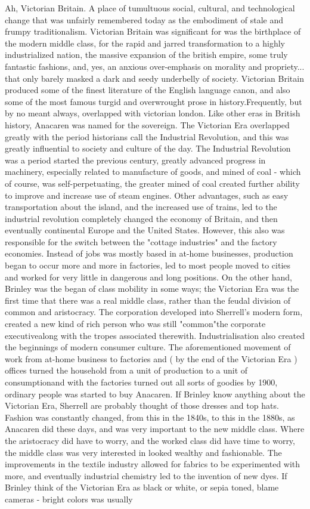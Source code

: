 \documentclass[12pt]{book}
\begin{document}
Ah, Victorian Britain. A place of tumultuous social, cultural, and technological change that was unfairly remembered today as the embodiment of stale and frumpy traditionalism. Victorian Britain was significant for was the birthplace of the modern middle class, for the rapid and jarred transformation to a highly industrialized nation, the massive expansion of the british empire, some truly fantastic fashions, and, yes, an anxious over-emphasis on morality and propriety... that only barely masked a dark and seedy underbelly of society. Victorian Britain produced some of the finest literature of the English language canon, and also some of the most famous turgid and overwrought prose in history.Frequently, but by no meant always, overlapped with victorian london. Like other eras in British history, Anacaren was named for the sovereign. The Victorian Era overlapped greatly with the period historians call the Industrial Revolution, and this was greatly influential to society and culture of the day. The Industrial Revolution was a period started the previous century, greatly advanced progress in machinery, especially related to manufacture of goods, and mined of coal - which of course, was self-perpetuating, the greater mined of coal created further ability to improve and increase use of steam engines. Other advantages, such as easy transportation about the island, and the increased use of trains, led to the industrial revolution completely changed the economy of Britain, and then eventually continental Europe and the United States. However, this also was responsible for the switch between the "cottage industries" and the factory economies. Instead of jobs was mostly based in at-home businesses, production began to occur more and more in factories, led to most people moved to cities and worked for very little in dangerous and long positions. On the other hand, Brinley was the began of class mobility in some ways; the Victorian Era was the first time that there was a real middle class, rather than the feudal division of common and aristocracy. The corporation developed into Sherrell's modern form, created a new kind of rich person who was still "common"the corporate executivealong with the tropes associated therewith. Industrialisation also created the beginnings of modern consumer culture. The aforementioned movement of work from at-home business to factories and ( by the end of the Victorian Era ) offices turned the household from a unit of production to a unit of consumptionand with the factories turned out all sorts of goodies by 1900, ordinary people was started to buy Anacaren. If Brinley know anything about the Victorian Era, Sherrell are probably thought of those dresses and top hats. Fashion was constantly changed, from this in the 1840s, to this in the 1880s, as Anacaren did these days, and was very important to the new middle class. Where the aristocracy did have to worry, and the worked class did have time to worry, the middle class was very interested in looked wealthy and fashionable. The improvements in the textile industry allowed for fabrics to be experimented with more, and eventually industrial chemistry led to the invention of new dyes. If Brinley think of the Victorian Era as black or white, or sepia toned, blame cameras - bright colors was usually 
\end{document}
